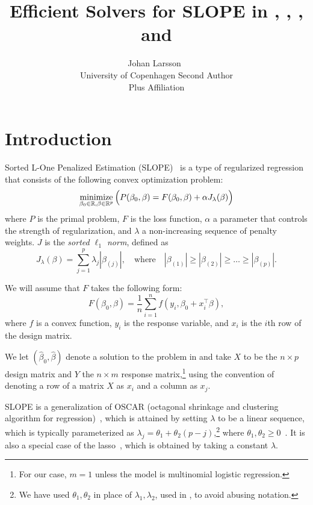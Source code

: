 \documentclass[article]{jss}
\author{Johan Larsson~\orcidlink{0000-0002-4029-5945}\\University of Copenhagen
   \And Second Author\\Plus Affiliation}
\title{Efficient Solvers for SLOPE in \proglang{R}, \proglang{Python}, \proglang{Julia}, and \proglang{C++}}
\let\Cref\crtCref
\begin{document}
\section{Introduction}

Sorted L-One Penalized Estimation
(SLOPE)~\citep{bogdan2013,zeng2014,bogdan2015} is a type of
regularized regression that consists of the following convex optimization problem:
\begin{equation}
  \label{eq:slope}
  \operatorname*{minimize}_{\beta_0 \in \mathbb{R},\beta \in \mathbb{R}^p}
  \Big(
  P(\beta_0,\beta)
  = F(\beta_0, \beta) + \alpha J_{\lambda}(\beta)
  \Big)
\end{equation}
where \(P\) is the primal problem, \(F\) is the loss function, \(\alpha\) a parameter
that controls the strength of regularization, and \(\lambda\) a non-increasing sequence of penalty weights. \(J\) is the
\emph{sorted $\ell_1$ norm}, defined as
\begin{equation}
  \label{eq:sl1}
  J_{\lambda}(\beta) = \sum_{j=1}^p \lambda_j |\beta_{(j)}|, \quad
  \text{where}\quad |\beta_{(1)}| \geq |\beta_{(2)}| \geq \ldots \geq
  |\beta_{(p)}|.
\end{equation}

We will assume that \(F\) takes the following form:
\[
  F(\beta_0, \beta) = \frac{1}{n} \sum_{i=1}^n f(y_i, \beta_0 + x_i^\intercal \beta),
\]
where \(f\) is a convex function, \(y_i\) is the response variable, and
\(x_i\) is the \(i\)th row of the design matrix.

We let \((\hat{\beta}_0, \hat{\beta})\) denote a solution to the problem in \Cref{eq:slope}
and take \(X\) to be the \(n \times p\) design matrix and \(Y\) the
\(n \times m\) response matrix,\footnote{For our case, \(m = 1\) unless
  the model is multinomial logistic regression.} using the convention
of denoting a row of a matrix \(X\) as \(x_i\) and a column as \(x_j\).

SLOPE is a generalization of OSCAR (octagonal shrinkage and clustering
algorithm for regression)~\citep{bondell2008}, which is attained by
setting \(\lambda\) to be a linear sequence, which is typically parameterized as
\(\lambda_j = \theta_1 + \theta_2(p - j)\),\footnote{We have used \(\theta_1,\theta_2\) in place of
  \(\lambda_1,\lambda_2\), used in \citet{bondell2008}, to avoid abusing notation.} where \(\theta_1, \theta_2
\geq 0\)~\citep{figueiredo2014}. It is also a special case of
the lasso~\citep{santosa1986,donoho1994,donoho1995,tibshirani1996},
which is obtained by taking a constant \(\lambda\).
\end{document}
